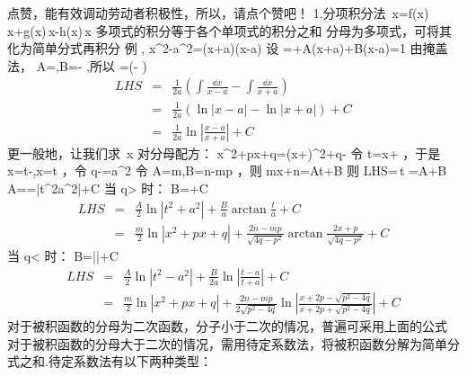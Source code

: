 
点赞，能有效调动劳动者积极性，所以，请点个赞吧！
1.分项积分法
\int \left[f(x)+g(x)-h(x)\right]\,x=\int f(x)\,x+\int g(x)\,x-\int h(x)\,x 
多项式的积分等于各个单项式的积分之和
分母为多项式，可将其化为简单分式再积分
例  \int {} , x^2-a^2=(x+a)(x-a) 
设 =+\Rightarrow A(x+a)+B(x-a)=1 
由掩盖法， A=,B=- ,所以 =\left(- \right) 
\begin{eqnarray}\label{eq} LHS&=&\frac{1}{2a}\left(\int\frac{\mathbb{d}x}{x-a}-\int\frac{\mathbb{d}x}{x+a}\right) \\&=&\frac{1}{2a}\left(\ln|x-a|-\ln|x+a|\right)+C \\&=&\frac{1}{2a}\ln\left|\frac{x-a}{x+a}\right|+C   \end{eqnarray} 
更一般地，让我们求 \int{}\,x 
对分母配方： x^2+px+q=\left(x+\right)^2+q- 
令 t=x+ ，于是 x=t-,x=t ，令 q-=\pm a^2 
令 A=m,B=n-mp ，则 mx+n=At+B 
则 LHS=\int{}\,t =A\int{}+B\int{} 
A\int{}=\int{}=\ln\left|t^2\pm a^2\right|+C 
当 q> 时：
B\int{}=+C  
\begin{eqnarray}\label{eq1} LHS&=&\frac{A}{2}\ln\left|t^2+ a^2\right|+\frac{B}{a}\arctan{\frac{t}{a}}+C \\&=&\frac{m}{2}\ln\left|x^2+px+q\right|+\frac{2n-mp}{\sqrt{4q-p^2}}\arctan{\frac{2x+p}{\sqrt{4q-p^2}}}+C \end{eqnarray} 
当 q< 时：
B\int{}=\ln\left|\right|+C 
\begin{eqnarray} LHS&=&\frac{A}{2}\ln\left|t^2- a^2\right|+\frac{B}{2a}\ln\left|\frac{t-a}{t+a}\right|+C \\&=&\frac{m}{2}\ln\left|x^2+px+q\right|+\frac{2n-mp}{2\sqrt{p^2-4q}}\ln\left|\frac{x+2p-\sqrt{p^2-4q}}{x+2p+\sqrt{p^2-4q}}\right|+C \end{eqnarray} 
对于被积函数的分母为二次函数，分子小于二次的情况，普遍可采用上面的公式
对于被积函数的分母大于二次的情况，需用待定系数法，将被积函数分解为简单分式之和.待定系数法有以下两种类型：
